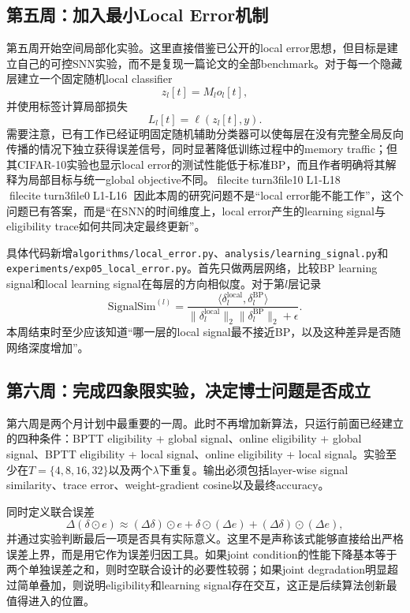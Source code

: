 \documentclass[journal,12pt,onecolumn]{IEEEtran}
\begin{document}
\subsection{第五周：加入最小Local Error机制}

第五周开始空间局部化实验。这里直接借鉴已公开的local error思想，但目标是建立自己的可控SNN实验，而不是复现一篇论文的全部benchmark。对于每一个隐藏层建立一个固定随机local classifier
\begin{equation}
z_l[t]=M_l o_l[t],
\end{equation}
并使用标签计算局部损失
\begin{equation}
L_l[t]=\ell(z_l[t],y).
\end{equation}
需要注意，已有工作已经证明固定随机辅助分类器可以使每层在没有完整全局反向传播的情况下独立获得误差信号，同时显著降低训练过程中的memory traffic；但其CIFAR-10实验也显示local error的测试性能低于标准BP，而且作者明确将其解释为局部目标与统一global objective不同。fileciteturn3file10L1-L18 fileciteturn3file0L1-L16 因此本周的研究问题不是“local error能不能工作”，这个问题已有答案，而是“在SNN的时间维度上，local error产生的learning signal与eligibility trace如何共同决定最终更新”。

具体代码新增\verb|algorithms/local_error.py|、\verb|analysis/learning_signal.py|和\verb|experiments/exp05_local_error.py|。首先只做两层网络，比较BP learning signal和local learning signal在每层的方向相似度。对于第$l$层记录
\begin{equation}
\mathrm{SignalSim}^{(l)}
=
\frac{
\langle\delta_l^{\mathrm{local}},\delta_l^{\mathrm{BP}}\rangle
}{
\|\delta_l^{\mathrm{local}}\|_2
\|\delta_l^{\mathrm{BP}}\|_2+\epsilon
}.
\end{equation}
本周结束时至少应该知道“哪一层的local signal最不接近BP，以及这种差异是否随网络深度增加”。

\subsection{第六周：完成四象限实验，决定博士问题是否成立}

第六周是两个月计划中最重要的一周。此时不再增加新算法，只运行前面已经建立的四种条件：BPTT eligibility + global signal、online eligibility + global signal、BPTT eligibility + local signal、online eligibility + local signal。实验至少在$T=\{4,8,16,32\}$以及两个$\lambda$下重复。输出必须包括layer-wise signal similarity、trace error、weight-gradient cosine以及最终accuracy。

同时定义联合误差
\begin{equation}
\Delta(\delta\odot e)
\approx
(\Delta\delta)\odot e
+
\delta\odot(\Delta e)
+
(\Delta\delta)\odot(\Delta e),
\end{equation}
并通过实验判断最后一项是否具有实际意义。这里不是声称该式能够直接给出严格误差上界，而是用它作为误差归因工具。如果joint condition的性能下降基本等于两个单独误差之和，则时空联合设计的必要性较弱；如果joint degradation明显超过简单叠加，则说明eligibility和learning signal存在交互，这正是后续算法创新最值得进入的位置。
\end{document}
